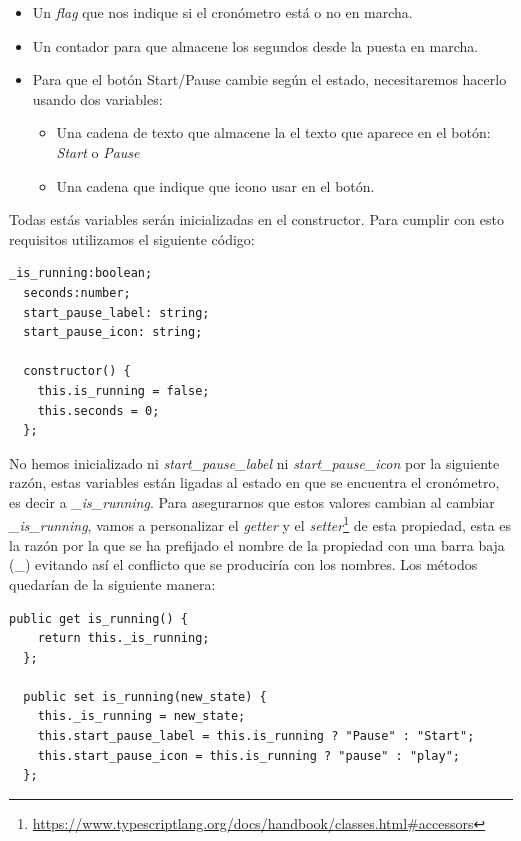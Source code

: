 \begin{itemize}
  \item Un \emph{flag} que nos indique si el cronómetro está o no en marcha.
  \item Un contador para que almacene los segundos desde la puesta en marcha.
  \item Para que el botón Start/Pause cambie según el estado, necesitaremos hacerlo usando dos variables:
  \begin{itemize}
    \item Una cadena de texto que almacene la el texto que aparece en el botón: \emph{Start} o \emph{Pause}
    \item Una cadena que indique que icono usar en el botón.
  \end{itemize}
\end{itemize}

Todas estás variables serán inicializadas en el constructor. Para cumplir con esto requisitos utilizamos el siguiente código:

\begin{lstlisting}[style=htmlcssjs,frame=tlrb,xleftmargin={0.2cm}]
  _is_running:boolean;
  seconds:number;
  start_pause_label: string;
  start_pause_icon: string;

  constructor() {
    this.is_running = false;
    this.seconds = 0;
  };
\end{lstlisting}


No hemos inicializado ni \emph{start\_pause\_label} ni \emph{start\_pause\_icon} por la siguiente razón, estas variables están ligadas al estado en que se encuentra el cronómetro, es decir a \emph{\_is\_running}. Para asegurarnos que estos valores cambian al cambiar \emph{\_is\_running}, vamos a personalizar el \emph{getter} y el \emph{setter}\footnote{\url{https://www.typescriptlang.org/docs/handbook/classes.html#accessors}} de esta propiedad, esta es la razón por la que se ha prefijado el nombre de la propiedad con una barra baja (\_) evitando así el conflicto que se produciría con los nombres. Los métodos quedarían de la siguiente manera:

\begin{lstlisting}[style=htmlcssjs,frame=tlrb,xleftmargin={0.2cm}]
  public get is_running() {
    return this._is_running;
  };

  public set is_running(new_state) {
    this._is_running = new_state;
    this.start_pause_label = this.is_running ? "Pause" : "Start";
    this.start_pause_icon = this.is_running ? "pause" : "play";
  };
\end{lstlisting}

